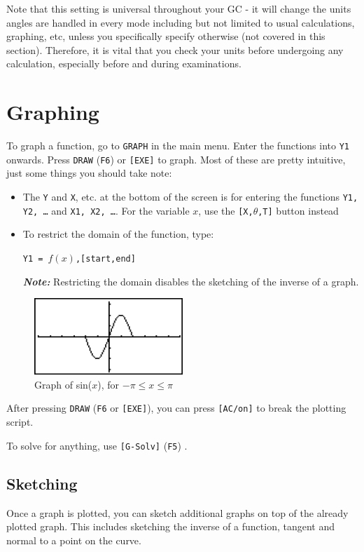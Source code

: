 \documentclass[a5paper]{memoir}
\def\code#1{\texttt{#1}}
\def\note#1{\textcolor[HTML]{109fa9}{\textbf{\textit{Note:}}} #1}
\def\Ffive{(\code{F5}) }
\def\Fsix{(\code{F6}) }
\begin{document}
Note that this setting is universal throughout your GC - it will change the units angles are handled in every mode including but not limited to usual calculations, graphing, etc, unless you specifically specify otherwise (not covered in this section). Therefore, it is vital that you check your units before undergoing any calculation, especially before and during examinations.

\section{Graphing} \label{sec:graphing}
To graph a function, go to \code{GRAPH} in the main menu. Enter the functions into \code{Y1} onwards. Press \code{DRAW} \Fsix or \code{[EXE]} to graph. Most of these are pretty intuitive, just some things you should take note:
\begin{itemize}
	\item The \code{Y} and \code{X}, etc. at the bottom of the screen is for entering the functions \code{Y1, Y2, \dots} and \code{X1, X2, \dots}. For the variable $x$, use the \code{[X,$\theta$,T]} button instead
	\item To restrict the domain of the function, type:
	\begin{center}
		\code{Y1 = $f(x)$,[start,end]}
	\end{center}
	\note{Restricting the domain disables the sketching of the inverse of a graph.}
\end{itemize}

\begin{figure}[h]
	\centering
	\includegraphics[width=0.5\textwidth]{sinx}
	\caption{Graph of sin($x$), for $-\pi \leq x \leq \pi$}
\end{figure}

After pressing \code{DRAW} (\code{F6} or \code{[EXE]}), you can press \code{[AC/on]} to break the plotting script.

To solve for anything, use \code{[G-Solv]} \Ffive.

\subsection{Sketching}
Once a graph is plotted, you can sketch additional graphs on top of the already plotted graph. This includes sketching the inverse of a function, tangent and normal to a point on the curve.
\end{document}
